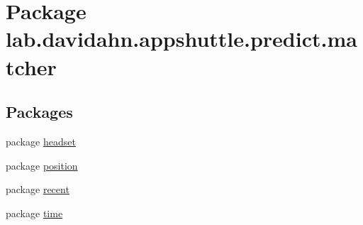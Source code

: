 \hypertarget{namespacelab_1_1davidahn_1_1appshuttle_1_1predict_1_1matcher}{\section{\-Package lab.\-davidahn.\-appshuttle.\-predict.\-matcher}
\label{namespacelab_1_1davidahn_1_1appshuttle_1_1predict_1_1matcher}
}
\subsection*{\-Packages}
\begin{DoxyCompactItemize}
\item 
package \hyperlink{namespacelab_1_1davidahn_1_1appshuttle_1_1predict_1_1matcher_1_1headset}{headset}
\item 
package \hyperlink{namespacelab_1_1davidahn_1_1appshuttle_1_1predict_1_1matcher_1_1position}{position}
\item 
package \hyperlink{namespacelab_1_1davidahn_1_1appshuttle_1_1predict_1_1matcher_1_1recent}{recent}
\item 
package \hyperlink{namespacelab_1_1davidahn_1_1appshuttle_1_1predict_1_1matcher_1_1time}{time}
\end{DoxyCompactItemize}
